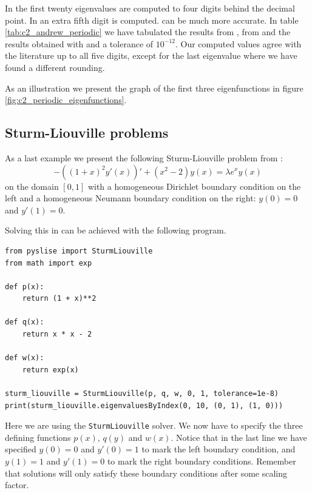 In \cite{andrew_correction_1989} the first twenty eigenvalues are computed to four digits behind the decimal point. In \cite{vandenberghe_modified_1995} an extra fifth digit is computed.  can be much more accurate. In table \ref{tab:c2_andrew_periodic} we have tabulated the results from \cite{andrew_correction_1989}, from \cite{vandenberghe_modified_1995} and the results obtained with \pyslise{} and a tolerance of $10^{-12}$. Our computed values agree with the literature up to all five digits, except for the last eigenvalue where we have found a different rounding.

As an illustration we present the graph of the first three eigenfunctions in figure \ref{fig:c2_periodic_eigenfunctions}.


\subsection{Sturm-Liouville problems}\label{sec:c2_experiment_sturm_liouville}

As a last example we present the following Sturm-Liouville problem from \cite{siedlecki_sturmliouville_2016}:
$$
    -\left((1+x)^2 y'(x)\right)' + \left(x^2 - 2\right) y(x) = \lambda e^x y(x)
$$
on the domain $[0, 1]$ with a homogeneous Dirichlet boundary condition on the left and a homogeneous Neumann boundary condition on the right: $y(0) = 0$ and $y'(1) = 0$.

Solving this in \pyslise{} can be achieved with the following program.
\begin{verbatim}
from pyslise import SturmLiouville
from math import exp

def p(x):
    return (1 + x)**2

def q(x):
    return x * x - 2

def w(x):
    return exp(x)
    
sturm_liouville = SturmLiouville(p, q, w, 0, 1, tolerance=1e-8)
print(sturm_liouville.eigenvaluesByIndex(0, 10, (0, 1), (1, 0)))
\end{verbatim}

Here we are using the \texttt{SturmLiouville} solver. We now have to specify the three defining functions $p(x)$, $q(y)$ and $w(x)$. Notice that in the last line we have specified $y(0) = 0$ and $y'(0) = 1$ to mark the left boundary condition, and $y(1) = 1$ and $y'(1) = 0$ to mark the right boundary conditions. Remember that solutions will only satisfy these boundary conditions after some scaling factor.

